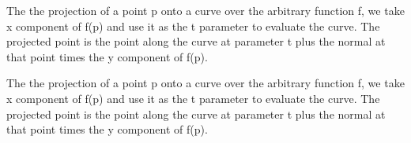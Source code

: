\documentclass{article}
\begin{document}
\begin{Maple Normal}{
\begin{Maple Normal}{
}\end{Maple Normal}
}\end{Maple Normal}
\begin{Maple Normal}{
\begin{Maple Normal}{
The the projection of a point  p onto a curve over the arbitrary function f, we take x component of f(p) and use it as the t parameter to evaluate the curve. The projected point is the point along the curve at parameter t plus the normal at that point times the y component of f(p).}\end{Maple Normal}

\begin{Maple Normal}{
The the projection of a point  p onto a curve over the arbitrary function f, we take x component of f(p) and use it as the t parameter to evaluate the curve. The projected point is the point along the curve at parameter t plus the normal at that point times the y component of f(p).}\end{Maple Normal}

}\end{Maple Normal}
\end{document}
